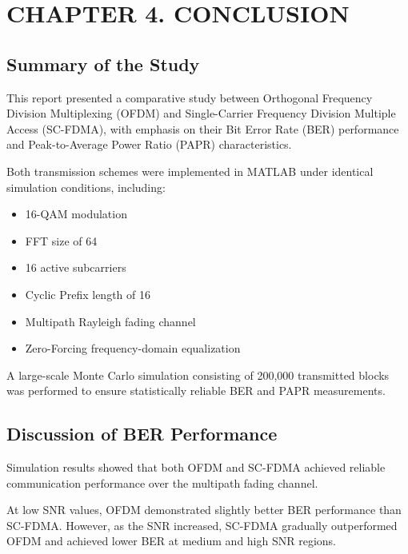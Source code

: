\section*{CHAPTER 4. CONCLUSION}

\setcounter{section}{4}
\setcounter{subsection}{0}
\setcounter{figure}{0}
\setcounter{table}{0}
\setcounter{equation}{0}

\subsection{Summary of the Study}

This report presented a comparative study between Orthogonal Frequency
Division Multiplexing (OFDM) and Single-Carrier Frequency Division Multiple
Access (SC-FDMA), with emphasis on their Bit Error Rate (BER) performance
and Peak-to-Average Power Ratio (PAPR) characteristics.

Both transmission schemes were implemented in MATLAB under identical
simulation conditions, including:

\begin{itemize}
    \item 16-QAM modulation
    \item FFT size of 64
    \item 16 active subcarriers
    \item Cyclic Prefix length of 16
    \item Multipath Rayleigh fading channel
    \item Zero-Forcing frequency-domain equalization
\end{itemize}

A large-scale Monte Carlo simulation consisting of 200,000 transmitted
blocks was performed to ensure statistically reliable BER and PAPR
measurements.

\subsection{Discussion of BER Performance}

Simulation results showed that both OFDM and SC-FDMA achieved reliable
communication performance over the multipath fading channel.

At low SNR values, OFDM demonstrated slightly better BER performance than
SC-FDMA. However, as the SNR increased, SC-FDMA gradually outperformed
OFDM and achieved lower BER at medium and high SNR regions.

